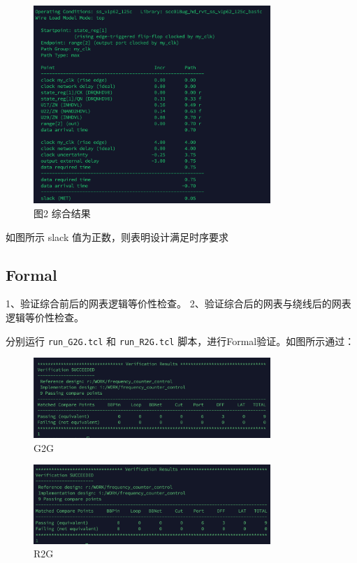 \begin{figure}[H]
    \centering
    \includegraphics[width=0.8\textwidth]{images/final-task03-02.png}
    \caption{图2 综合结果}
\end{figure}

如图所示 slack 值为正数，则表明设计满足时序要求

\subsection{Formal}

1、验证综合前后的网表逻辑等价性检查。
2、验证综合后的网表与绕线后的网表逻辑等价性检查。

分别运行 \texttt{run\_G2G.tcl} 和 \texttt{run\_R2G.tcl} 脚本，进行Formal验证。如图所示通过：

\begin{figure}[H]
    \centering
    \includegraphics[width=0.8\textwidth]{images/final-task03-11.png}
    \caption{G2G}
\end{figure}

\begin{figure}[H]
    \centering
    \includegraphics[width=0.8\textwidth]{images/final-task03-12.png}
    \caption{R2G}
\end{figure}

